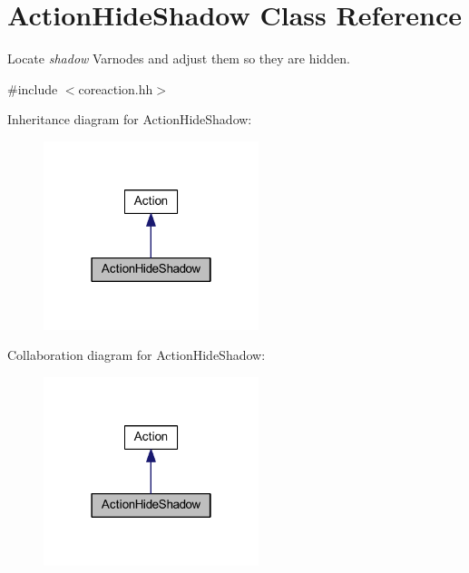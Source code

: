 \hypertarget{class_action_hide_shadow}{}\section{Action\+Hide\+Shadow Class Reference}
\label{class_action_hide_shadow}


Locate {\itshape shadow} Varnodes and adjust them so they are hidden.  




{\ttfamily \#include $<$coreaction.\+hh$>$}



Inheritance diagram for Action\+Hide\+Shadow\+:
\nopagebreak
\begin{figure}[H]
\begin{center}
\leavevmode
\includegraphics[width=178pt]{class_action_hide_shadow__inherit__graph}
\end{center}
\end{figure}


Collaboration diagram for Action\+Hide\+Shadow\+:
\nopagebreak
\begin{figure}[H]
\begin{center}
\leavevmode
\includegraphics[width=178pt]{class_action_hide_shadow__coll__graph}
\end{center}
\end{figure}
